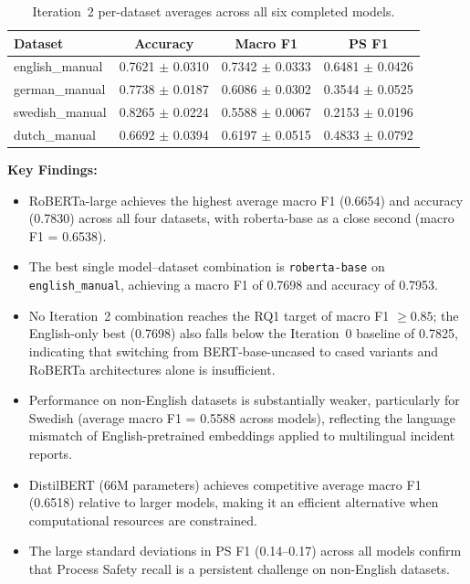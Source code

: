 \documentclass[11pt, titlepage, bibliography=totoc]{scrreprt}
\begin{document}
\begin{table}[htbp]
\centering
\caption{Iteration~2 per-dataset averages across all six completed models.}
\label{tab:results-iter2-datasets}
\begin{tabular}{@{}lccc@{}}
\toprule
\textbf{Dataset} & \textbf{Accuracy} & \textbf{Macro F1} & \textbf{PS F1} \\
\midrule
english\_manual  & 0.7621 $\pm$ 0.0310 & 0.7342 $\pm$ 0.0333 & 0.6481 $\pm$ 0.0426 \\
german\_manual   & 0.7738 $\pm$ 0.0187 & 0.6086 $\pm$ 0.0302 & 0.3544 $\pm$ 0.0525 \\
swedish\_manual  & 0.8265 $\pm$ 0.0224 & 0.5588 $\pm$ 0.0067 & 0.2153 $\pm$ 0.0196 \\
dutch\_manual    & 0.6692 $\pm$ 0.0394 & 0.6197 $\pm$ 0.0515 & 0.4833 $\pm$ 0.0792 \\
\bottomrule
\end{tabular}
\end{table}

\textbf{Key Findings:}
\begin{itemize}
    \item RoBERTa-large achieves the highest average macro F1 (0.6654) and accuracy (0.7830) across all four datasets, with roberta-base as a close second (macro F1 = 0.6538).
    \item The best single model--dataset combination is \texttt{roberta-base} on \texttt{english\_manual}, achieving a macro F1 of 0.7698 and accuracy of 0.7953.
    \item No Iteration~2 combination reaches the RQ1 target of macro F1 $\geq 0.85$; the English-only best (0.7698) also falls below the Iteration~0 baseline of 0.7825, indicating that switching from BERT-base-uncased to cased variants and RoBERTa architectures alone is insufficient.
    \item Performance on non-English datasets is substantially weaker, particularly for Swedish (average macro F1 = 0.5588 across models), reflecting the language mismatch of English-pretrained embeddings applied to multilingual incident reports.
    \item DistilBERT (66M parameters) achieves competitive average macro F1 (0.6518) relative to larger models, making it an efficient alternative when computational resources are constrained.
    \item The large standard deviations in PS F1 (0.14--0.17) across all models confirm that Process Safety recall is a persistent challenge on non-English datasets.
\end{itemize}
\end{document}
